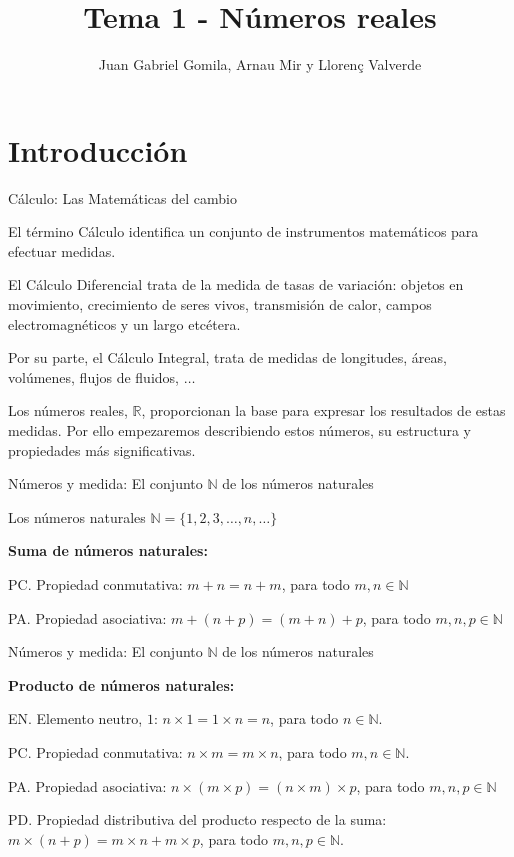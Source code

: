 \documentclass[ignorenonframetext,]{beamer}
\title{Tema 1 - Números reales}
\author{Juan Gabriel Gomila, Arnau Mir y Llorenç Valverde}
\date{}
\begin{document}
\frame{\titlepage}

\hypertarget{introducciuxf3n}{%
\section{Introducción}\label{introducciuxf3n}}

\begin{frame}{Cálculo: Las Matemáticas del cambio}
\protect\hypertarget{cuxe1lculo-las-matemuxe1ticas-del-cambio}{}

El término Cálculo identifica un conjunto de instrumentos matemáticos
para efectuar medidas.

El Cálculo Diferencial trata de la medida de tasas de variación: objetos
en movimiento, crecimiento de seres vivos, transmisión de calor, campos
electromagnéticos y un largo etcétera.

Por su parte, el Cálculo Integral, trata de medidas de longitudes,
áreas, volúmenes, flujos de fluidos, \(\ldots\)

Los números reales, \(\mathbb{R}\), proporcionan la base para expresar
los resultados de estas medidas. Por ello empezaremos describiendo estos
números, su estructura y propiedades más significativas.

\end{frame}

\begin{frame}{Números y medida: El conjunto \(\mathbb{N}\) de los
números naturales}
\protect\hypertarget{nuxfameros-y-medida-el-conjunto-mathbbn-de-los-nuxfameros-naturales}{}

Los números naturales \(\mathbb{N} = \{1,2,3, \ldots ,n, \ldots \}\)

\textbf{Suma de números naturales:}

PC. Propiedad conmutativa: \(m+n =n+m\), para todo
\(m,n \in \mathbb{N}\)

PA. Propiedad asociativa: \(m+(n+p) = (m+n)+p\), para todo
\(m,n,p \in \mathbb{N}\)

\end{frame}

\begin{frame}{Números y medida: El conjunto \(\mathbb{N}\) de los
números naturales}
\protect\hypertarget{nuxfameros-y-medida-el-conjunto-mathbbn-de-los-nuxfameros-naturales-1}{}

\textbf{Producto de números naturales:}

EN. Elemento neutro, \(1\): \(n \times 1 = 1 \times n =n\), para todo
\(n \in \mathbb{N}\).

PC. Propiedad conmutativa: \(n \times m = m \times n\), para todo
\(m,n \in \mathbb{N}\).

PA. Propiedad asociativa:
\(n\times (m \times p) = (n \times m)\times p\), para todo
\(m,n,p \in \mathbb{N}\)

PD. Propiedad distributiva del producto respecto de la suma:
\(m \times (n+p) = m\times n +m\times p\), para todo
\(m,n,p \in \mathbb{N}\).

\end{frame}
\end{document}
